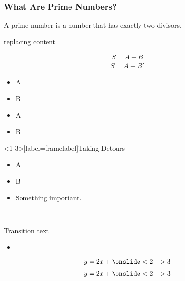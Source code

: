 \documentclass{beamer}
\begin{document}
\begin{frame}
  \frametitle{What Are Prime Numbers?}
  \begin{definition}
    A \alert{prime number} is a number that has exactly two divisors.
  \end{definition}
\end{frame}

\begin{frame}{replacing content}
  \begin{overprint}
    \begin{multline*}
      S = A + B
    \end{multline*}
    \begin{multline*}
      S = A + B'
    \end{multline*}
  \end{overprint}

\begin{itemize}[<+->]
\item A
\item B
\end{itemize}

\begin{itemize}[<+-|alert@+>]
\item A
\item B
\end{itemize}

\end{frame}


\begin{frame}<1-3>[label=framelabel]{Taking Detours}
  \begin{itemize}
  \item A
    \pause
  \item B
    \pause
  \item\alert<4->{Something important.
  }
  \end{itemize}
\end{frame}

\

\begin{frame}
  Transition text
  \begin{itemize}
  \item {}
  \end{itemize}
  \begin{equation*} y = 2x + \onslide<2->{3} \end{equation*}
  \begin{align*} y = 2x + \onslide<2->{3} \end{align*}
\end{frame}

\end{document}
